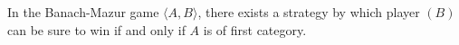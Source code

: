 In the Banach-Mazur game $\langle A, B \rangle$, there exists a strategy by which player $(B)$ can be sure to win if and only if $A$ is of first category.
